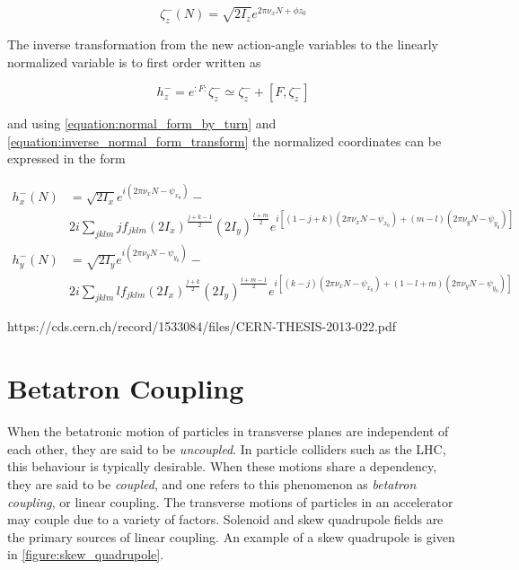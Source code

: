\begin{equation}
    \zeta_{z}^{-}(N) = \sqrt{2 I_{z}} e^{2 \pi \nu_{x} N + \phi z_{0}}
    \label{equation:normal_form_by_turn}
\end{equation}

The inverse transformation from the new action-angle variables to the linearly normalized variable is to first order written as

\begin{equation}
    h_{z}^{-} = e^{: F:} \zeta_{z}^{-} \simeq \zeta_{z}^{-} + \left[F, \zeta_{z}^{-}\right]
    \label{equation:inverse_normal_form_transform}
\end{equation}

and using \cref{equation:normal_form_by_turn} and \cref{equation:inverse_normal_form_transform} the normalized coordinates can be expressed in the form

\begin{equation}
    \begin{aligned}
    h_{x}^{-}(N) &= \sqrt{2 I_{x}} e^{i\left(2 \pi \nu_{x} N - \psi_{x_{0}}\right)} - \\
    & 2 i \sum_{jklm} j f_{jklm} \left(2 I_{x}\right)^{\frac{j+k-1}{2}} \left(2 I_{y}\right)^{\frac{l+m}{2}} e^{i \left[(1-j+k) \left(2 \pi \nu_{x} N-\psi_{x_{0}}\right) + (m-l) \left(2 \pi \nu_{y} N-\psi_{y_{0}}\right) \right]} \\
    h_{y}^{-}(N) &= \sqrt{2 I_{y}} e^{i\left(2 \pi \nu_{y} N - \psi_{y_{0}}\right)} - \\
    & 2 i \sum_{jklm} l f_{jklm} \left(2 I_{x}\right)^{\frac{j+k}{2}} \left(2 I_{y}\right)^{\frac{l+m-1}{2}} e^{i \left[(k-j) \left(2 \pi \nu_{x} N-\psi_{x_{0}}\right) + (1-l+m) \left(2 \pi \nu_{y} N-\psi_{y_{0}}\right) \right]}
    \end{aligned}
    \label{equation:normal_form_coordinates}
\end{equation}

https://cds.cern.ch/record/1533084/files/CERN-THESIS-2013-022.pdf


\section{Betatron Coupling}

When the betatronic motion of particles in transverse planes are independent of each other, they are said to be \emph{uncoupled}.
In particle colliders such as the LHC, this behaviour is typically desirable.
When these motions share a dependency, they are said to be \emph{coupled}, and one refers to this phenomenon as \emph{betatron coupling}, or linear coupling.
The transverse motions of particles in an accelerator may couple due to a variety of factors.
Solenoid and skew quadrupole fields are the primary sources of linear coupling.
An example of a skew quadrupole is given in \cref{figure:skew_quadrupole}.

